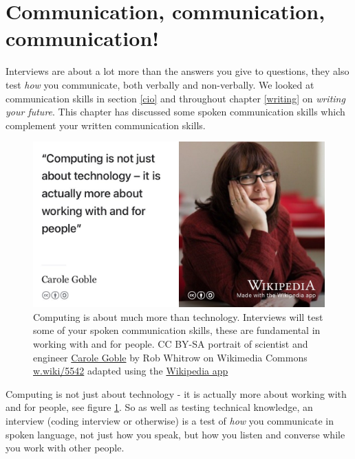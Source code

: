 \documentclass[
]{book}
\begin{document}
\hypertarget{comms}{%
\section{Communication, communication, communication!}\label{comms}}

Interviews are about a lot more than the answers you give to questions, they also test \emph{how} you communicate, both verbally and non-verbally. We looked at communication skills in section \ref{cio} and throughout chapter \ref{writing} on \emph{writing your future}. This chapter has discussed some spoken communication skills which complement your written communication skills.

\begin{figure}

{\centering \includegraphics[width=0.98\linewidth]{images/carole-goble} 

}

\caption{Computing is about much more than technology. Interviews will test some of your spoken communication skills, these are fundamental in working with and for people. \citep{frengoble} CC BY-SA portrait of scientist and engineer \href{https://en.wikipedia.org/wiki/Carole_Goble}{Carole Goble} by Rob Whitrow on Wikimedia Commons \href{https://w.wiki/5542}{w.wiki/5542} adapted using the \href{https://apps.apple.com/gb/app/wikipedia/id324715238}{Wikipedia app}}\label{fig:carole-goble-fig}
\end{figure}



Computing is not just about technology - it is actually more about working with and for people, see figure \ref{fig:carole-goble-fig}. So as well as testing technical knowledge, an interview (coding interview or otherwise) is a test of \emph{how} you communicate in spoken language, not just how you speak, but how you listen and converse while you work with other people. \citep{frengoble}
\end{document}
